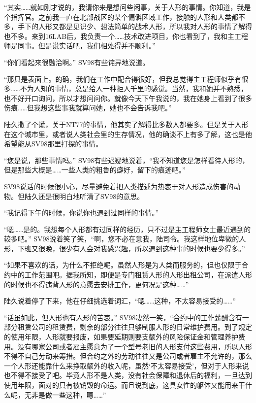 “其实……就如刚才说的，我请你来是想问些闲事，关于人形的事情。你知道，我是个指挥官。之前我一直在北部战区的某个偏僻区域工作，接触的人形和人类都不多，手下的人形又都是见识少、想法简单的战术人形，所以我对人形的事情了解得也不多。来到16LAB后，我负责一个……技术改进项目，你也看到了，我和主工程师是同事。但是说实话吧，我们相处得并不顺利。”

“你们看起来很融洽啊。” SV98有些诧异地说道。

“那只是表面上。的确，我们在工作中配合得很好，但我总觉得主工程师似乎有很多……不为人知的事情，总是给人一种拒人千里的感觉。当然，我和她并不熟悉，也不好开口询问，所以才想问问你。就像今天下午我说的，我在她身上看到了很多伤痕……但我想这些事我就算问她，她也不会告诉我吧。”

陆久撒了个谎，关于NT77的事情，他其实了解得比多数人都要多。但是关于人形在这个城市里，或者说人类社会里的生存情况，他的确谈不上有多了解，这也是他希望能从SV98那里打探的事情。

“您是说，那些事情吗。” SV98有些迟疑地说着，“我不知道您是怎样看待人形的，但是那些大概是……一些人类的粗鲁的癖好，留下的痕迹吧。”

SV98说话的时候很小心，尽量避免着把人类描述为热衷于对人形造成伤害的动物。但陆久还是很明白地听清了SV98的意思。

“我记得下午的时候，你说你也遇到过同样的事情。”

“嗯……是的。我想每个人形都有过同样的经历，只不过是主工程师女士最近遇到的较多吧。” SV98说着笑了笑，“啊，您不必在意我，陆司令。我这样地位卑微的人形，下班又很晚，很少有人会对我感兴趣，所以遇到这种事的时候也要少得多。”

“如果不喜欢的话，为什么不拒绝呢。虽然人形是为人类而服务的，但也仅限于合约中的工作范围吧。据我所知，即便是专门租赁人形的人形出租公司，在派遣人形的时候也不得违背人形的意愿去安排工作，更何况是这种……”

陆久说着停了下来，他在仔细挑选着词汇，“嗯……这种，不太容易接受的……”

“话虽如此，但人形也有人形的苦衷。” SV98凄然一笑，“合约中的工作薪酬含有一部分租赁公司的租赁费，剩余的部分往往只够制服人形的日常维护费用。到了规定的使用年限，人形就要报废，如果要延期则要支额外的风险保证金和管理养护费用。没有哪家公司或者雇主愿意为了一个型号老旧的人形支付这些费用，所以人形不得不自己劳动来筹措。但合约之外的劳动往往又是公司或者雇主不允许的，那么一个人形还能靠什么来挣取额外的收入呢，虽然‘不太容易接受’，但对于人形来说也不得不接受了吧。毕竟人形不是人类，没有社会保障和退休后的福利，一旦达到使用年限，面对的只有被销毁的命运。而且说到底，这具女性的躯体又能用来干什么呢，无非是做一些这种，嗯……”

